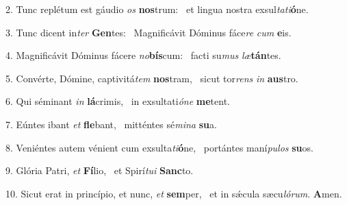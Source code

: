 2. Tunc replétum est gáudio \textit{os} \textbf{nos}trum: \ast\  et lingua nostra exsul\textit{ta}\textit{ti}\textbf{ó}ne.\

3. Tunc dicent in\textit{ter} \textbf{Gen}tes: \ast\  Magnificávit Dóminus fáce\textit{re} \textit{cum} \textbf{e}is.\

4. Magnificávit Dóminus fácere \textit{no}\textbf{bís}cum: \ast\  facti su\textit{mus} \textit{læ}\textbf{tán}tes.\

5. Convérte, Dómine, captivitá\textit{tem} \textbf{nos}tram, \ast\  sicut tor\textit{rens} \textit{in} \textbf{aus}tro.\

6. Qui séminant \textit{in} \textbf{lá}crimis, \ast\  in exsultati\textit{ó}\textit{ne} \textbf{me}tent.\

7. Eúntes ibant \textit{et} \textbf{fle}bant, \ast\  mitténtes sé\textit{mi}\textit{na} \textbf{su}a.\

8. Veniéntes autem vénient cum exsulta\textit{ti}\textbf{ó}ne, \ast\  portántes maní\textit{pu}\textit{los} \textbf{su}os.\

9. Glória Patri, \textit{et} \textbf{Fí}lio, \ast\  et Spirí\textit{tu}\textit{i} \textbf{Sanc}to.\

10. Sicut erat in princípio, et nunc, \textit{et} \textbf{sem}per, \ast\  et in sǽcula sæcu\textit{ló}\textit{rum}. \textbf{A}men.\

